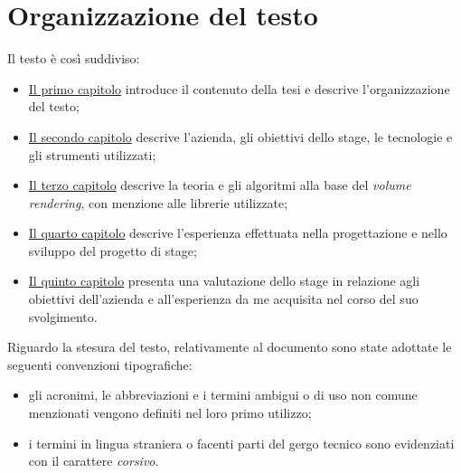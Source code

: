 \section{Organizzazione del testo}

Il testo è così suddiviso:
\begin{itemize}
    \item \hyperref[cap:introduzione]{Il primo capitolo} introduce il contenuto della tesi e descrive l'organizzazione del testo;
    \item \hyperref[cap:descrizione-stage]{Il secondo capitolo} descrive l'azienda, gli obiettivi dello stage, le tecnologie e gli strumenti utilizzati;
    \item \hyperref[cap:teoria-stage]{Il terzo capitolo} descrive la teoria e gli algoritmi alla base del \emph{volume rendering}, con menzione alle librerie utilizzate;
    \item \hyperref[cap:resoconto-stage]{Il quarto capitolo} descrive l'esperienza effettuata nella progettazione e nello sviluppo del progetto di stage;
	\item \hyperref[cap:conclusioni]{Il quinto capitolo} presenta una valutazione dello stage in relazione agli obiettivi dell'azienda e all'esperienza da me acquisita nel corso del suo svolgimento.
\end{itemize}


Riguardo la stesura del testo, relativamente al documento sono state adottate le seguenti convenzioni tipografiche:
\begin{itemize}
	\item gli acronimi, le abbreviazioni e i termini ambigui o di uso non comune menzionati vengono definiti nel loro primo utilizzo;
	\item i termini in lingua straniera o facenti parti del gergo tecnico sono evidenziati con il carattere \emph{corsivo}.
\end{itemize}